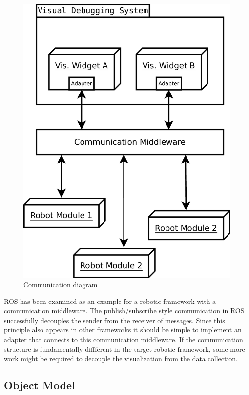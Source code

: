 \begin{figure}[htbp]
  \centering
  \includegraphics[width=.7\textwidth]{diagrams/communication_diagram}
  \caption{Communication diagram}
  \label{communication_diagram}
\end{figure}

\q
ROS has been examined as an example for a robotic framework with a communication middleware. The publish/subscribe style communication in ROS successfully decouples the sender from the receiver of messages. Since this principle also appears in other frameworks it should be simple to implement an adapter that connects to this communication middleware. If the communication structure is fundamentally diffferent in the target robotic framework, some more work might be required to decouple the visualization from the data collection.

\q

\subsection{Object Model}


